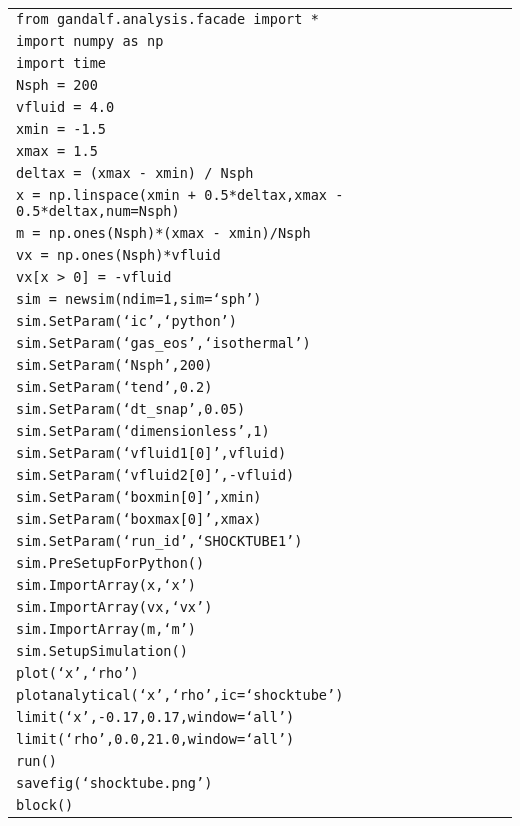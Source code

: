 \documentclass[a4paper]{article}
\newcommand{\var}[1]{\texttt{#1}}
\begin{document}
\begin{tabular}{p{14.0cm}}
\var{from gandalf.analysis.facade import *} \\
\var{import numpy as np} \\
\var{import time} \\
\var{Nsph = 200} \\
\var{vfluid = 4.0} \\
\var{xmin = -1.5} \\
\var{xmax = 1.5} \\
\var{deltax = (xmax - xmin) / Nsph} \\
\var{x = np.linspace(xmin + 0.5*deltax,xmax - 0.5*deltax,num=Nsph)} \\
\var{m = np.ones(Nsph)*(xmax - xmin)/Nsph} \\
\var{vx = np.ones(Nsph)*vfluid}  \\
\var{vx[x > 0] = -vfluid} \\
\var{sim = newsim(ndim=1,sim=`sph')} \\
\var{sim.SetParam(`ic',`python')} \\
\var{sim.SetParam(`gas\_eos',`isothermal')}  \\
\var{sim.SetParam(`Nsph',200)}  \\
\var{sim.SetParam(`tend',0.2)}  \\
\var{sim.SetParam(`dt\_snap',0.05)} \\
\var{sim.SetParam(`dimensionless',1)} \\
\var{sim.SetParam(`vfluid1[0]',vfluid)} \\
\var{sim.SetParam(`vfluid2[0]',-vfluid)} \\
\var{sim.SetParam(`boxmin[0]',xmin)} \\
\var{sim.SetParam(`boxmax[0]',xmax)} \\
\var{sim.SetParam(`run\_id',`SHOCKTUBE1')} \\
\var{sim.PreSetupForPython()} \\
\var{sim.ImportArray(x,`x')} \\
\var{sim.ImportArray(vx,`vx')} \\
\var{sim.ImportArray(m,`m')}   \\
\var{sim.SetupSimulation()}  \\
\var{plot(`x',`rho')} \\
\var{plotanalytical(`x',`rho',ic=`shocktube')} \\
\var{limit(`x',-0.17,0.17,window=`all')} \\
\var{limit(`rho',0.0,21.0,window=`all')} \\
\var{run()} \\
\var{savefig(`shocktube.png')} \\
\var{block()} \\
\end{tabular} \\
\newline
\end{document}
